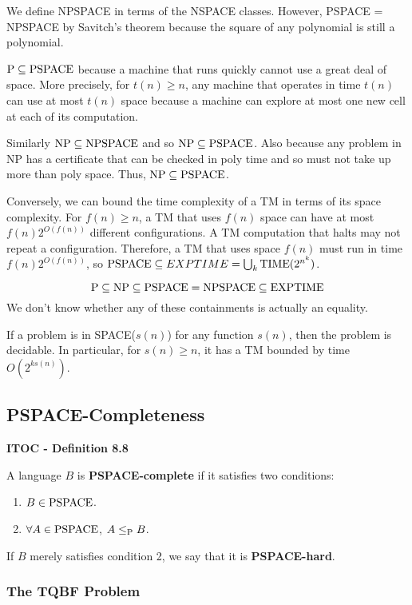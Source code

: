 We define NPSPACE in terms of the NSPACE classes. However, PSPACE = NPSPACE by Savitch's theorem because the square of any polynomial is still a polynomial.

$\P \subseteq \PSPACE$ because a machine that runs quickly cannot use a great deal of space. More precisely, for $t(n) \geq n$, any machine that operates in time $t(n)$ can use at most $t(n)$ space because a machine can explore at most one new cell at each of its computation.

Similarly $\NP \subseteq \NPSPACE$ and so $\NP \subseteq \PSPACE$. Also because any problem in NP has a certificate that can be checked in poly time and so must not take up more than poly space. Thus, $\NP \subseteq \PSPACE$.

Conversely, we can bound the time complexity of a TM in terms of its space complexity. For $f(n) \geq n$, a TM that uses $f(n)$ space can have at most $f(n)2^{O(f(n))}$ different configurations. A TM computation that halts may not repeat a configuration. Therefore, a TM that uses space $f(n)$ must run in time $f(n) 2^{O(f(n))}$, so $\PSPACE \subseteq EXPTIME = \bigcup_k \TIME(2^{n^k})$.

\[
\P \subseteq \NP \subseteq \PSPACE = \NPSPACE \subseteq \EXPTIME
\]
We don't know whether any of these containments is actually an equality.

If a problem is in SPACE($s(n)$) for any function $s(n)$, then the problem is decidable. In particular, for $s(n) \geq n$, it has a TM bounded by time $O(2^{ks(n)})$.

\subsection{PSPACE-Completeness}

\begin{shaded}
\textbf{ITOC - Definition 8.8}

\medskip
A language $B$ is \textbf{PSPACE-complete} if it satisfies two conditions:
\begin{enumerate}
\item $B\in \PSPACE$.
\item $\forall A \in \PSPACE$, $A \leq_\P B$.
\end{enumerate}

If $B$ merely satisfies condition 2, we say that it is \textbf{PSPACE-hard}.
\end{shaded}

\subsubsection{The TQBF Problem}

